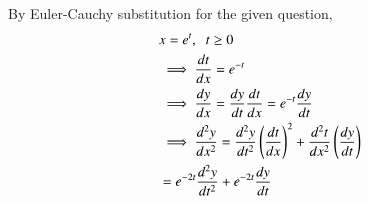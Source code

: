 \documentclass[journal,12pt,twocolumn]{IEEEtran}
\theoremstyle{remark}
\begin{document}
By Euler-Cauchy substitution for the given question,
\begin{align}
    &x=e^t,\;\;t\geq 0 \label{gateME49.eqn:1}\\ 
    &\implies \frac{dt}{dx}=e^{-t}\\
    &\implies \frac{dy}{dx}=\frac{dy}{dt}\frac{dt}{dx}= e^{-t}\frac{dy}{dt}\\
    &\implies \frac{d^2y}{dx^2}=\frac{d^2y}{dt^2}\left(\frac{dt}{dx}\right)^2+\frac{d^2t}{dx^2}\left(\frac{dy}{dt}\right)\\
    &=e^{-2t}\frac{d^2y}{dt^2}+e^{-2t}\frac{dy}{dt} 
\end{align}
\end{document}
